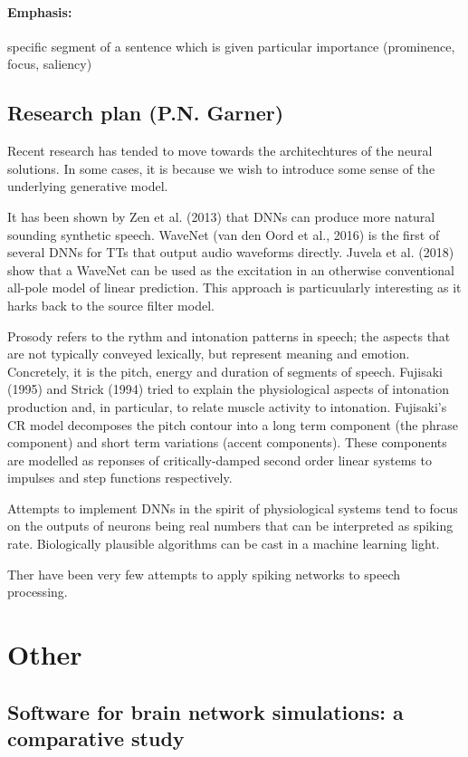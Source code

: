 \documentclass[12pt]{article}
\begin{document}
\paragraph{Emphasis:} specific segment of a sentence which is given particular importance (prominence, focus, saliency)

\subsection{Research plan (P.N. Garner)}
Recent research has tended to move towards the architechtures of the neural solutions. In some cases, it is because we wish to introduce some sense of the underlying generative model.

It has been shown by Zen et al. (2013) that DNNs can produce more natural sounding synthetic speech. WaveNet (van den Oord et al., 2016) is the first of several DNNs for TTs that output audio waveforms directly. Juvela et al. (2018) show that a WaveNet can be used as the excitation in an otherwise conventional all-pole model of linear prediction. This approach is particuularly interesting as it harks back to the source filter model.

Prosody refers to the rythm and intonation patterns in speech; the aspects that are not typically conveyed lexically, but represent meaning and emotion. Concretely, it is the pitch, energy and duration of segments of speech.
Fujisaki (1995) and Strick (1994) tried to explain the physiological aspects of intonation production and, in particular, to relate muscle activity to intonation.
Fujisaki's CR model decomposes the pitch contour into a long term component (the phrase component) and short term variations (accent components). These components are modelled as reponses of critically-damped second order linear systems to impulses and step functions respectively.

Attempts to implement DNNs in the spirit of physiological systems tend to focus on the outputs of neurons being real numbers that can be interpreted as spiking rate.
Biologically plausible algorithms can be cast in a machine learning light.

Ther have been very few attempts to apply spiking networks to speech processing.


\section{Other}
\subsection{Software for brain network simulations: a comparative study \cite{tikidji2017software}}
\end{document}
